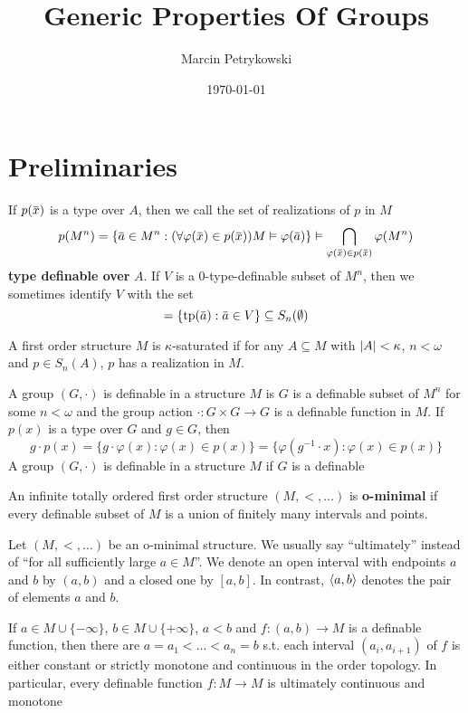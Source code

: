 \documentclass[11pt]{article}
\author{Marcin Petrykowski}
\date{\today}
\title{Generic Properties Of Groups}
\begin{document}
\maketitle
\tableofcontents


\section{Preliminaries}
\label{sec:org865ca19}
If \(p(\barx)\) is a type over \(A\), then we call the set of realizations of \(p\) in \(M\)
\begin{equation*}
p(M^n)=\{\bara\in M^n:(\forall\varphi(\barx)\in p(\barx))M\vDash\varphi(\bara)\}\vDash\bigcap_{\varphi(\barx)\in p(\barx)}\varphi(M^n)
\end{equation*}
\textbf{type definable over} \(A\). If \(V\) is a 0-type-definable subset of \(M^n\), then we sometimes
 identify \(V\) with the set
 \begin{equation*}
[V]=\{\tp(\bara):\bara\in V\}\subseteq S_n(\emptyset)
 \end{equation*}

A first order structure \(M\) is \(\kappa\)-saturated if for any \(A\subseteq M\) with \(\abs{A}<\kappa\), \(n<\omega\)
and \(p\in S_n(A)\), \(p\) has a realization in \(M\).

A group \((G,\cdot)\) is definable in a structure \(M\) is \(G\) is a definable subset of \(M^n\)
for some \(n<\omega\) and the group action \(\cdot:G\times G\to G\) is a definable function in \(M\).
If \(p(x)\) is a type over \(G\) and \(g\in G\), then
 \begin{equation*}
g\cdot p(x)=\{g\cdot\varphi(x):\varphi(x)\in p(x)\}=\{\varphi(g^{-1}\cdot x):\varphi(x)\in p(x)\}
 \end{equation*}
A group \((G,\cdot)\) is definable in a structure \(M\) if \(G\) is a definable

An infinite totally ordered first order structure \((M,<,\dots)\) is \textbf{o-minimal} if every definable
subset of \(M\) is a union of finitely many intervals and points.

Let \((M,<,\dots)\) be an o-minimal structure. We usually say ``ultimately'' instead of ``for all
sufficiently large \(a\in M\)''. We denote an open interval with endpoints \(a\) and \(b\)
by \((a,b)\) and a closed one by \([a,b]\). In contrast, \(\langle a,b\rangle\) denotes the pair of
elements \(a\) and \(b\).

If \(a\in M\cup\{-\infty\}\), \(b\in M\cup\{+\infty\}\), \(a<b\) and \(f:(a,b)\to M\) is a definable function, then there
are \(a=a_1<\dots<a_n=b\) s.t. each interval \((a_i,a_{i+1})\) of \(f\) is either constant or
strictly monotone and continuous in the order topology. In particular, every definable
function \(f:M\to M\) is ultimately continuous and monotone
\end{document}
